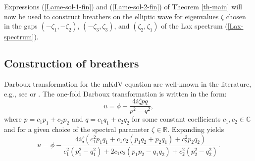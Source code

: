 \documentclass[12pt,reqno]{amsart}
\numberwithin{equation}{section}
\begin{document}
Expressions (\ref{Lame-sol-1-fin}) and (\ref{Lame-sol-2-fin}) of Theorem \ref{th-main} will now be used to construct breathers on the elliptic wave for  eigenvalues $\zeta$ chosen in the gaps $(-\zeta_1,-\zeta_2)$, $(-\zeta_3,\zeta_3)$, and $(\zeta_2,\zeta_1)$ of the Lax spectrum (\ref{Lax-spectrum}).


\subsection{Construction of breathers}

Darboux transformation for the mKdV equation are well-known in the literature, e.g., see \cite{Gu,Matveev} or \cite[Appendix]{CP2018}.
The one-fold Darboux transformation is written in the form:
\begin{equation}
\label{DT}
u = \phi - \frac{4i \zeta p q}{p^2 - q^2},
\end{equation}
where $p = c_1 p_1 + c_2 p_2$ and $q = c_1 q_1 + c_2 q_2$ for some constant coefficients $c_1,c_2 \in \mathbb{C}$ and for a given choice of the spectral parameter $\zeta \in \mathbb{R}$. Expanding yields 
\begin{equation}
\label{DT-expand}
u = \phi - \frac{4i \zeta (c_1^2 p_1 q_1 + c_1 c_2 (p_1 q_2 + p_2 q_1) + c_2^2 p_2 q_2)}{c_1^2 (p_1^2 - q_1^2) + 2c_1 c_2 (p_1 p_2 - q_1 q_2) + c_2^2 (p_2^2 - q_2^2)}.
\end{equation}
\end{document}
